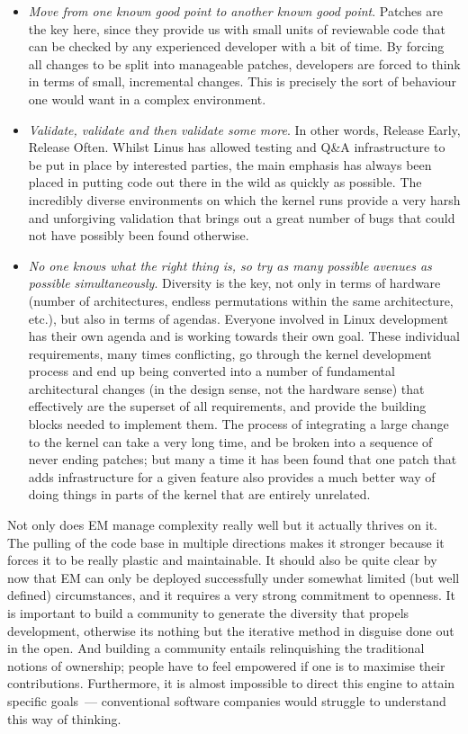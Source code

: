 \documentclass{book}
\begin{document}
\begin{itemize}
\item \emph{Move from one known good point to another known good
  point}. Patches are the key here, since they provide us with small
  units of reviewable code that can be checked by any experienced
  developer with a bit of time. By forcing all changes to be split
  into manageable patches, developers are forced to think in terms of
  small, incremental changes. This is precisely the sort of behaviour
  one would want in a complex environment.
\item \emph{Validate, validate and then validate some more}. In other
  words, Release Early, Release Often. Whilst Linus has allowed
  testing and Q\&A infrastructure to be put in place by interested
  parties, the main emphasis has always been placed in putting code
  out there in the wild as quickly as possible. The incredibly diverse
  environments on which the kernel runs provide a very harsh and
  unforgiving validation that brings out a great number of bugs that
  could not have possibly been found otherwise.
\item \emph{No one knows what the right thing is, so try as many
  possible avenues as possible simultaneously}. Diversity is the key,
  not only in terms of hardware (number of architectures, endless
  permutations within the same architecture, etc.), but also in terms
  of agendas. Everyone involved in Linux development has their own
  agenda and is working towards their own goal. These individual
  requirements, many times conflicting, go through the kernel
  development process and end up being converted into a number of
  fundamental architectural changes (in the design sense, not the
  hardware sense) that effectively are the superset of all
  requirements, and provide the building blocks needed to implement
  them. The process of integrating a large change to the kernel can
  take a very long time, and be broken into a sequence of never ending
  patches; but many a time it has been found that one patch that adds
  infrastructure for a given feature also provides a much better way
  of doing things in parts of the kernel that are entirely unrelated.
\end{itemize}

Not only does EM manage complexity really well but it actually thrives
on it. The pulling of the code base in multiple directions makes it
stronger because it forces it to be really plastic and
maintainable. It should also be quite clear by now that EM can only be
deployed successfully under somewhat limited (but well defined)
circumstances, and it requires a very strong commitment to
openness. It is important to build a community to generate the
diversity that propels development, otherwise its nothing but the
iterative method in disguise done out in the open. And building a
community entails relinquishing the traditional notions of ownership;
people have to feel empowered if one is to maximise their
contributions. Furthermore, it is almost impossible to direct this
engine to attain specific goals~--- conventional software companies
would struggle to understand this way of thinking.
\end{document}
